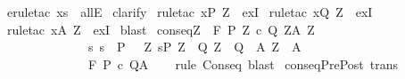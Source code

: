 \begin{isabellebody}
\isamarkupfalse%
\ {\isacharparenleft}erule{\isacharunderscore}tac\ x{\isacharequal}s\ \ allE{\isacharparenright}\isanewline
{}\isamarkupfalse%
\ {\isacharparenleft}clarify{\isacharparenright}\isanewline
{}\isamarkupfalse%
\ {\isacharparenleft}rule{\isacharunderscore}tac\ x{\isacharequal}{\isachardoublequoteopen}P{\isacharprime}\ Z{\isachardoublequoteclose}\ \ exI{\isacharparenright}\isanewline
{}\isamarkupfalse%
\ {\isacharparenleft}rule{\isacharunderscore}tac\ x{\isacharequal}{\isachardoublequoteopen}Q{\isacharprime}\ Z{\isachardoublequoteclose}\ \ exI{\isacharparenright}\isanewline
{}\isamarkupfalse%
\ {\isacharparenleft}rule{\isacharunderscore}tac\ x{\isacharequal}{\isachardoublequoteopen}A{\isacharprime}\ Z{\isachardoublequoteclose}\ \ exI{\isacharparenright}\isanewline
{}\isamarkupfalse%
\ blast\isanewline
{}\isamarkupfalse%
%
\endisatagproof
{\isafoldproof}%
%
\isadelimproof
\isanewline
%
\endisadelimproof
\isanewline
{}\isamarkupfalse%
\ conseq{\isacharcolon}{\isachardoublequoteopen}{\isasymlbrakk}{\isasymforall}Z{\isachardot}\ {\isasymGamma}{\isacharcomma}{\isasymTheta}\ {\isasymturnstile}\isactrlbsub {\isacharslash}F\isactrlesub \ {\isacharparenleft}P{\isacharprime}\ Z{\isacharparenright}\ c\ {\isacharparenleft}Q{\isacharprime}\ Z{\isacharparenright}{\isacharcomma}{\isacharparenleft}A{\isacharprime}\ Z{\isacharparenright}{\isacharsemicolon}\isanewline
\ \ \ \ \ \ \ \ \ \ \ \ \ \ {\isasymforall}s{\isachardot}\ s\ {\isasymin}\ P\ {\isasymlongrightarrow}\ {\isacharparenleft}{\isasymexists}\ Z{\isachardot}\ s{\isasymin}P{\isacharprime}\ Z\ {\isasymand}\ {\isacharparenleft}Q{\isacharprime}\ Z\ {\isasymsubseteq}\ Q{\isacharparenright}\ {\isasymand}\ {\isacharparenleft}A{\isacharprime}\ Z\ {\isasymsubseteq}\ A{\isacharparenright}{\isacharparenright}{\isasymrbrakk}\isanewline
\ \ \ \ \ \ \ \ \ \ \ \ \ \ {\isasymLongrightarrow}\isanewline
\ \ \ \ \ \ \ \ \ \ \ \ \ \ {\isasymGamma}{\isacharcomma}{\isasymTheta}{\isasymturnstile}\isactrlbsub {\isacharslash}F\isactrlesub \ P\ c\ Q{\isacharcomma}A{\isachardoublequoteclose}\isanewline
%
\isadelimproof
\ \ %
\endisadelimproof
%
\isatagproof
{}\isamarkupfalse%
\ {\isacharparenleft}rule\ Conseq{\isacharparenright}\ blast%
\endisatagproof
{\isafoldproof}%
%
\isadelimproof
\isanewline
%
\endisadelimproof
\isanewline
{}\isamarkupfalse%
\ conseqPrePost\ {\isacharbrackleft}trans{\isacharbrackright}{\isacharcolon}\ \isanewline

\end{isabellebody}
